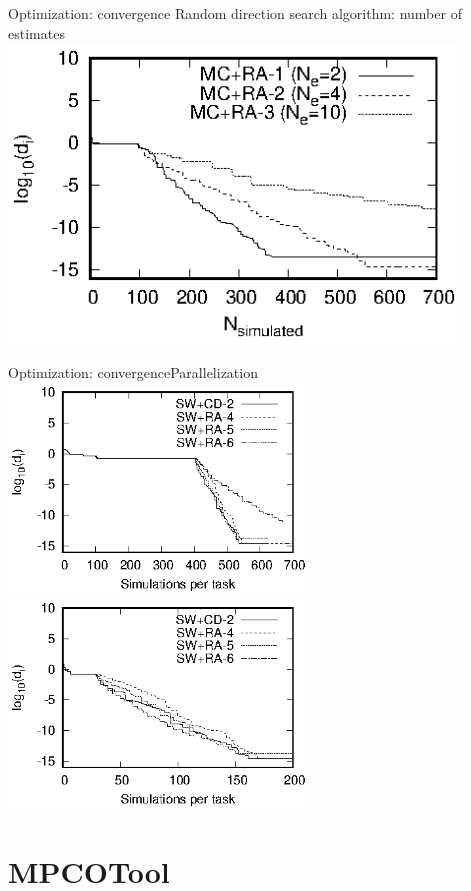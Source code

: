 \documentclass[10pt]{beamer}
\begin{document}
\begin{frame}{Optimization: convergence}
{Random direction search algorithm: number of estimates}
	\includegraphics[width=0.9\textwidth]{sphere-evolution-mc-r.eps}
\end{frame}

\begin{frame}{Optimization: convergence}{Parallelization}
	\includegraphics[width=0.6\textwidth]{sphere-task-2-4.eps}\\
	\includegraphics[width=0.6\textwidth]{sphere-task-2-64.eps}
\end{frame}

\section{MPCOTool}
\end{document}

